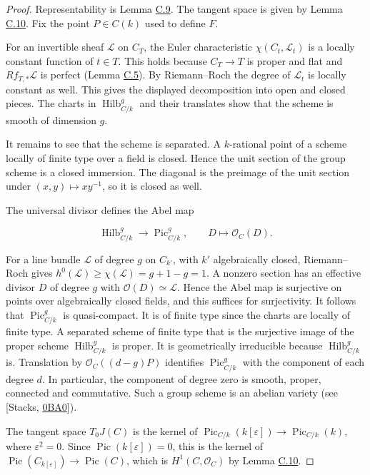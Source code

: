 \documentclass[11pt]{article}
\begin{document}
\begin{proof}[{Proof}]\label{bp37}%
Representability is Lemma \hyperref[bp31]{C.9}. The tangent space is given by Lemma \hyperref[bp34]{C.10}. Fix the point \(P\in C(k)\) used to define \(F\).

For an invertible sheaf \(\mathcal L\) on \(C_T\), the Euler characteristic \(\chi(C_t,\mathcal L_t)\) is a locally constant function of \(t\in T\). This holds because \(C_T\to T\) is proper and flat and \(Rf_{T,*}\mathcal L\) is perfect (Lemma \hyperref[bp17]{C.5}). By Riemann–Roch the degree of \(\mathcal L_t\) is locally constant as well. This gives the displayed decomposition into open and closed pieces. The charts in \(\operatorname{Hilb}^{g}_{C/k}\) and their translates show that the scheme is smooth of dimension \(g\).

It remains to see that the scheme is separated. A \(k\)-rational point of a scheme locally of finite type over a field is closed. Hence the unit section of the group scheme is a closed immersion. The diagonal is the preimage of the unit section under \((x,y)\mapsto xy^{-1}\), so it is closed as well.

The universal divisor defines the Abel map

\[
\operatorname{Hilb}^{g}_{C/k}\longrightarrow\operatorname{Pic}^g_{C/k},
\qquad D\longmapsto\mathcal O_C(D).
\]

For a line bundle \(\mathcal L\) of degree \(g\) on \(C_{k'}\), with \(k'\) algebraically closed, Riemann–Roch gives \(h^0(\mathcal L)\geq\chi(\mathcal L)=g+1-g=1\). A nonzero section has an effective divisor \(D\) of degree \(g\) with \(\mathcal O(D)\simeq\mathcal L\). Hence the Abel map is surjective on points over algebraically closed fields, and this suffices for surjectivity. It follows that \(\operatorname{Pic}^g_{C/k}\) is quasi-compact. It is of finite type since the charts are locally of finite type. A separated scheme of finite type that is the surjective image of the proper scheme \(\operatorname{Hilb}^{g}_{C/k}\) is proper. It is geometrically irreducible because \(\operatorname{Hilb}^{g}_{C/k}\) is. Translation by \(\mathcal O_C((d-g)P)\) identifies \(\operatorname{Pic}^g_{C/k}\) with the component of each degree \(d\). In particular, the component of degree zero is smooth, proper, connected and commutative. Such a group scheme is an abelian variety (see [Stacks, \href{https://stacks.math.columbia.edu/tag/0BA0}{0BA0}]).

The tangent space \(T_0J(C)\) is the kernel of \(\operatorname{Pic}_{C/k}(k[\varepsilon])\to\operatorname{Pic}_{C/k}(k)\), where \(\varepsilon^2=0\). Since \(\operatorname{Pic}(k[\varepsilon])=0\), this is the kernel of \(\operatorname{Pic}(C_{k[\varepsilon]})\to\operatorname{Pic}(C)\), which is \(H^1(C,\mathcal O_C)\) by Lemma \hyperref[bp34]{C.10}.


\end{proof}
\end{document}
